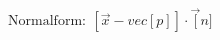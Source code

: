 \documentclass[preview]{standalone}
\begin{document}
\begin{center}
$\mathrm{Normalform: \:} [\vec{x} - vec[p]] \cdot \vec[n]$
\end{center}
\end{document}
